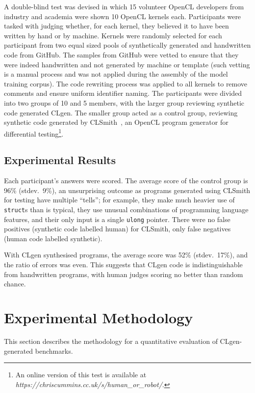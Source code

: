 A double-blind test was devised in which 15 volunteer OpenCL developers from industry and academia were shown 10 OpenCL kernels each. Participants were tasked with judging whether, for each kernel, they believed it to have been written by hand or by machine. Kernels were randomly selected for each participant from two equal sized pools of synthetically generated and handwritten code from GitHub. The samples from GitHub were vetted to ensure that they were indeed handwritten and not generated by machine or template (such vetting is a manual process and was not applied during the assembly of the model training corpus). The code rewriting process was applied to all kernels to remove comments and ensure uniform identifier naming. The participants were divided into two groups of 10 and 5 members, with the larger group reviewing synthetic code generated CLgen. The smaller group acted as a control group, reviewing synthetic code generated by CLSmith~\cite{Lidbury2015a}, an OpenCL program generator for differential testing\footnote{An online version of this test is available at \emph{https://chriscummins.cc.uk/s/human\_or\_robot/}.}.


\subsection{Experimental Results}

Each participant's answers were scored. The average score of the control group is 96\% (stdev.\ 9\%), an unsurprising outcome as programs generated using CLSmith for testing have multiple ``tells''; for example, they make much heavier use of \texttt{struct}s than is typical, they use unusual combinations of programming language features, and their only input is a single \texttt{ulong} pointer. There were no false positives (synthetic code labelled human) for CLSmith, only false negatives (human code labelled synthetic).

With CLgen synthesised programs, the average score was 52\% (stdev.\ 17\%), and the ratio of errors was even. This suggests that CLgen code is indistinguishable from handwritten programs, with human judges scoring no better than random chance.


\section{Experimental Methodology}
\label{sec:clgen-eval-methodology}

This section describes the methodology for a quantitative evaluation of CLgen-generated benchmarks.


